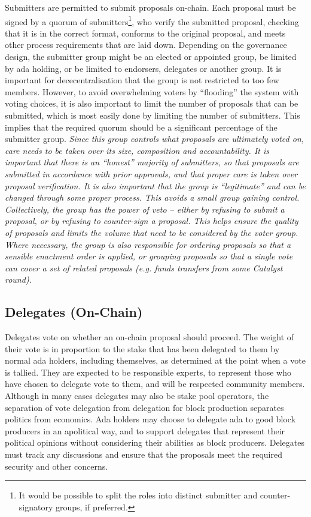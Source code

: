 Submitters are permitted to submit proposals on-chain.  Each proposal must be signed by a quorum of submitters\footnote{It would be possible to split the roles into distinct submitter and counter-signatory groups, if preferred.},
who verify the submitted proposal, checking that it is in the correct format, conforms to the original proposal, and meets other process requirements that are laid down.
Depending on the governance design, the submitter group might %
be an elected or appointed group, be limited by ada holding, or be limited to endorsers, delegates or another group.
It is important for dececentralisation that the group is not restricted to too few members.
However, to avoid overwhelming voters by ``flooding'' the system with voting choices, it is also important to limit the number of proposals that can
be submitted, which is most easily done by limiting the number of submitters.  This implies that the required quorum should be a significant percentage
of the submitter group.
\emph{Since this group controls what proposals are ultimately voted on, care needs to be taken over its size, composition and accountability.  It is important that there is an ``honest'' majority of submitters,
so that proposals are submitted in accordance with prior approvals, and that proper care is taken over proposal verification.  It is also important that the group is ``legitimate''
and can be changed through some proper process.  This avoids a small group gaining control.  Collectively, the group has the power of veto -- either by refusing to submit a proposal, or by
refusing to counter-sign a proposal.  This helps ensure the quality of proposals and limits the volume that need to be considered by the voter group.  Where necessary, the group is also responsible for ordering
proposals so that a sensible enactment order is applied, or grouping proposals so that a single vote can cover a set of related proposals (e.g. funds transfers from some Catalyst round).}

\subsection{Delegates (On-Chain)}

Delegates vote on whether an on-chain proposal should proceed.  The weight of
their vote is in proportion to the stake that has been delegated to them by
normal ada holders, including themselves, as determined at the point when a vote is tallied.
They are expected to be responsible
experts, to represent those who have chosen to delegate vote to them, and will
be respected community members.  Although in many cases delegates may also be
stake pool operators, the separation of vote delegation from delegation for
block production separates politics from economics.  Ada holders may choose to
delegate ada to good block producers in an apolitical way, and to support
delegates that represent their political opinions without considering their abilities as
block producers.  Delegates must track any discussions and ensure that the proposals meet the required
security and other concerns.

